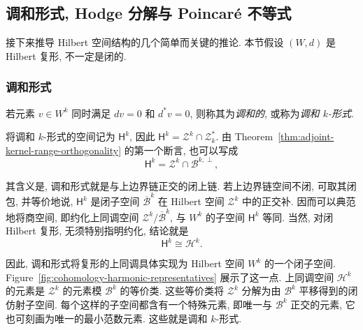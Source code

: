 \subsection{{调和形式, Hodge 分解与 Poincaré 不等式}}\label{sec:harmonic-hodge-poincare}

{接下来推导 Hilbert 空间结构的几个简单而关键的推论. 本节假设 $(W,d)$ 是 Hilbert 复形, 不一定是闭的.}

\subsubsection{{调和形式}}\label{subsec:harmonic-forms}

\begin{Definition}\label{def:harmonic-form}
{若元素 $v\in W^k$ 同时满足 $dv=0$ 和 $d^*v=0$, 则称其为\emph{调和的}, 或称为\emph{调和 $k$-形式}.}
\end{Definition}

{将调和 $k$-形式的空间记为 $\mathsf H^k$, 因此 $\mathsf H^k=\mathcal Z^k\cap\mathcal Z_k^*$. 由 Theorem~\ref{thm:adjoint-kernel-range-orthogonality} 的第一个断言, 也可以写成}
\begin{equation}\label{eq:harmonic-cocycle-orthogonality}
\mathsf H^k=\mathcal Z^k\cap\mathcal B^{k,\perp},
\end{equation}

{其含义是, 调和形式就是与上边界链正交的闭上链. 若上边界链空间不闭, 可取其闭包, 并等价地说, $\mathsf H^k$ 是闭子空间 $\overline{\mathcal B}^k$ 在 Hilbert 空间 $\mathcal Z^k$ 中的正交补. 因而可以典范地将商空间, 即约化上同调空间 $\mathcal Z^k/\overline{\mathcal B}^k$, 与 $W^k$ 的子空间 $\mathsf H^k$ 等同. 当然, 对闭 Hilbert 复形, 无须特别指明约化, 结论就是}
\begin{equation}\label{eq:harmonic-cohomology-isomorphism}
\mathsf H^k\cong\mathcal H^k.
\end{equation}

{因此, 调和形式将复形的上同调具体实现为 Hilbert 空间 $W^k$ 的一个闭子空间. Figure~\ref{fig:cohomology-harmonic-representatives} 展示了这一点. 上同调空间 $\mathcal H^k$ 的元素是 $\mathcal Z^k$ 的元素模 $\mathcal B^k$ 的等价类. 这些等价类将 $\mathcal Z^k$ 分解为由 $\mathcal B^k$ 平移得到的闭仿射子空间. 每个这样的子空间都含有一个特殊元素, 即唯一与 $\mathcal B^k$ 正交的元素, 它也可刻画为唯一的最小范数元素. 这些就是调和 $k$-形式.}

